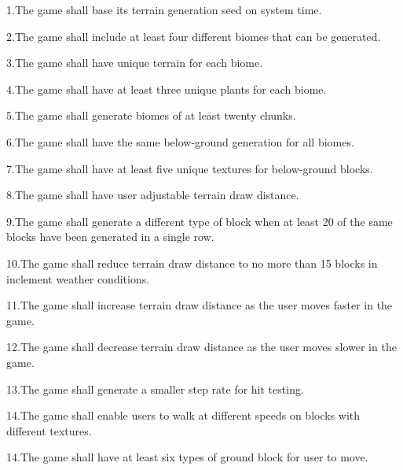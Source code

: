 \label{Requirements_R1}%
%
1.\+The game shall base its terrain generation seed on system time.

\label{Requirements_R2}%
%
2.\+The game shall include at least four different biomes that can be generated.

\label{Requirements_R3}%
%
3.\+The game shall have unique terrain for each biome.

\label{Requirements_R4}%
%
4.\+The game shall have at least three unique plants for each biome.

\label{Requirements_R5}%
%
5.\+The game shall generate biomes of at least twenty chunks.

\label{Requirements_R6}%
%
6.\+The game shall have the same below-\/ground generation for all biomes.

\label{Requirements_R7}%
%
7.\+The game shall have at least five unique textures for below-\/ground blocks.

\label{Requirements_R8}%
%
8.\+The game shall have user adjustable terrain draw distance.

\label{Requirements_R9}%
%
9.\+The game shall generate a different type of block when at least 20 of the same blocks have been generated in a single row.

\label{Requirements_R10}%
%
10.\+The game shall reduce terrain draw distance to no more than 15 blocks in inclement weather conditions.

\label{Requirements_R11}%
%
11.\+The game shall increase terrain draw distance as the user moves faster in the game.

\label{Requirements_R12}%
%
12.\+The game shall decrease terrain draw distance as the user moves slower in the game.

\label{Requirements_R13}%
%
13.\+The game shall generate a smaller step rate for hit testing.

\label{Requirements_R14}%
%
14.\+The game shall enable users to walk at different speeds on blocks with different textures.

\label{Requirements_R15}%
%
14.\+The game shall have at least six types of ground block for user to move.

